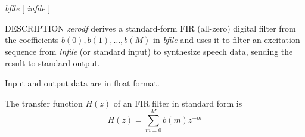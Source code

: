 % 
% 
% 
% 
%                                                                        
%

\begin{synopsis}
\item[zerodf] [ --m $M$ ] [ --p $P$ ] [ --i $I$ ] [ --t ] [ --k ]
		{\em bfile} [ {\em infile} ]
\end{synopsis}

\begin{qsection}{DESCRIPTION}
{\em zerodf} derives a standard-form FIR (all-zero) digital filter 
from the coefficients $b(0), b(1), \dots, b(M)$ in {\em bfile} 
and uses it to filter an excitation sequence 
from {\em infile} (or standard input) to synthesize speech data, 
sending the result to standard output.

Input and output data are in float format.

The transfer function $H(z)$ of an FIR filter in standard form is
\begin{displaymath}
H(z) = \sum_{m=0}^{M} b(m) z^{-m}
\end{displaymath}
\end{qsection}

